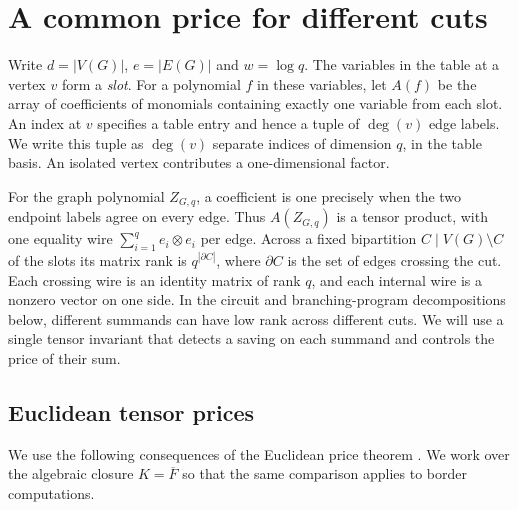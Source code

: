 \section{A common price for different cuts}\label{sec:cuts}

Write $d=|V(G)|$, $e=|E(G)|$ and $w=\log q$. The variables in the
table at a vertex $v$ form a \emph{slot}. For a polynomial $f$ in
these variables, let $A(f)$ be the array of coefficients of monomials
containing exactly one variable from each slot. An index at $v$
specifies a table entry and hence a tuple of $\deg(v)$ edge labels.
We write this tuple as $\deg(v)$ separate indices of dimension $q$,
in the table basis. An isolated vertex contributes a one-dimensional
factor.

For the graph polynomial $Z_{G,q}$, a coefficient is one precisely when
the two endpoint labels agree on every edge. Thus $A(Z_{G,q})$ is a
tensor product, with one equality wire $\sum_{i=1}^q e_i\otimes e_i$
per edge. Across a fixed bipartition $C\mid V(G)\setminus C$ of the
slots its matrix rank is $q^{|\partial C|}$, where $\partial C$ is the
set of edges crossing the cut. Each crossing wire is an identity matrix
of rank $q$, and each internal wire is a nonzero vector on one side.
In the circuit and branching-program decompositions below, different
summands can have low rank across different cuts. We will use a
single tensor invariant that detects a saving on each summand and
controls the price of their sum.

\subsection*{Euclidean tensor prices}

We use the following consequences of the Euclidean price theorem
\cite[Theorem~, Section~ and
Lemma~]{oaG}. We work over the algebraic
closure $K=\overline F$ so that the same comparison applies to border
computations.

